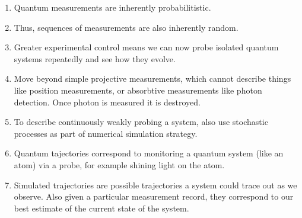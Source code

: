 \begin{enumerate}
\item Quantum measurements are inherently probabilitistic.  
\item Thus, sequences of measurements are also inherently random.  
\item Greater experimental control means we can now probe isolated quantum systems repeatedly and see how they evolve.  
\item Move beyond simple projective measurements, which cannot describe things like position measurements,
    or absorbtive measurements like photon detection.  Once photon is measured it is destroyed.
\item To describe continuously weakly probing a system, also use stochastic processes as part of
    numerical simulation strategy.
\item Quantum tajectories correspond to monitoring a quantum system (like an atom) via a probe,
 for example shining light on the atom. \cite{Carmichael1993}
\item Simulated trajectories are possible trajectories a system could trace out as we observe.
  Also given a particular measurement record, they correspond to our best estimate of the current state of the system.  
\end{enumerate}

